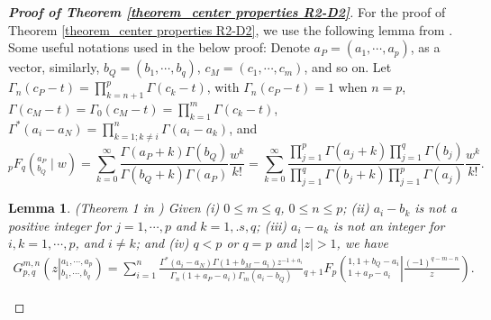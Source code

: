 \documentclass[12pt]{article}
\newtheorem{lemma}{Lemma}
\begin{document}
\begin{proof} [\textbf{Proof of Theorem \ref{theorem_center properties R2-D2}}]
	For the proof of Theorem \ref{theorem_center properties R2-D2}, we use the following lemma from \cite{fields1972asymptotic}.  Some useful notations used in the below proof:
	Denote $a_P = (a_1,\cdots, a_p)$, as  a vector, similarly,  $b_Q = (b_1,\cdots, b_q)$,  $c_M = (c_1,\cdots, c_m)$, and so on. Let
	$\Gamma_n(c_P-t) = \prod_{k=n+1}^p \Gamma(c_k-t)$,  with 	$\Gamma_n(c_P-t) =1$ when $n=p$,
	$\Gamma(c_M-t) = \Gamma_0(c_M-t) =\prod_{k=1}^m \Gamma(c_k-t)$,
	$\Gamma^\ast(a_i-a_N) = \prod_{k=1;k\neq i}^n  \Gamma(a_i-a_k)$, and
	\[	{}_pF_q\left(  ^{a_P}_{b_Q} \mid  w
	\right) = \sum\limits_{k=0}^{\infty} \frac{\Gamma(a_P+k) \Gamma(b_Q)}{\Gamma(b_Q+k)\Gamma(a_P)} \frac{w^k}{k!}
	= \sum\limits_{k=0}^{\infty} \frac{\prod\limits_{j=1}^p\Gamma(a_j+k) \prod\limits_{j=1}^q\Gamma(b_j)}{\prod\limits_{j=1}^q\Gamma(b_j+k)\prod\limits_{j=1}^p\Gamma(a_j)} \frac{w^k}{k!}.
	\]
	\begin{lemma} \label{lemma_meijer g approximation}
		(Theorem 1 in \cite{fields1972asymptotic})
		Given  (i) $0\leq m \leq q$, $0\leq n \leq p$; (ii) $a_i - b_k $ is not a positive integer for $j=1, \cdots,  p$ and $k=1,.s , q$;   (iii) $a_i-a_k$ is not an integer for $i,k = 1,\cdots,  p$,  and $i\neq k$; and (iv)  $q< p$  or $q=p$ and $|z|>1$,
		we have
		\begin{eqnarray*}
			G_{p,q}^{m,n}
			\left( z \left\vert^{  a_1, \cdots,a_p}_{b_1, \cdots, b_q} \right.
			\right)
			=  \sum\limits_{i=1}^{n}      \frac{\Gamma^\ast (a_i-a_N) \Gamma(1+b_M-a_i) z^{-1+a_i}} {\Gamma_n(1+a_P-a_i)\Gamma_m(a_i-b_Q)}
			{}_{q+1}F_p
			\left(  _{1+a_P-a_i}^{1,1+b_Q-a_i}
			\left\vert\frac{(-1)^{q-m-n}}{z} \right.
			\right).
		\end{eqnarray*}
	\end{lemma}


\end{proof}
\end{document}
